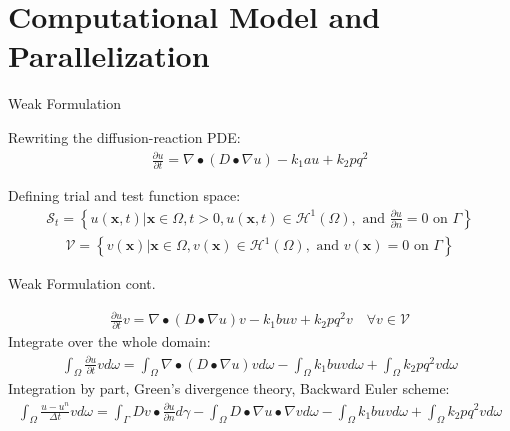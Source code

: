 \documentclass[11pt,t]{beamer}
\begin{document}
\section{Computational Model and Parallelization}

\begin{frame}[fragile]{Weak Formulation}

Rewriting the diffusion-reaction PDE:
\begin{gather*}
\frac{\partial u}{\partial t}=\nabla \bullet (D \bullet  \nabla u)-k_{1} a u+k_{2} p q^{2}
\end{gather*}

Defining trial and test function space:
\begin{gather*}
\mathcal{S}_{t}=\left\{u(\mathbf{x}, t) | \mathbf{x} \in \Omega, t>0, u(\mathbf{x}, t) \in \mathcal{H}^{1}(\Omega), \text { and } \frac{\partial u}{\partial n}=0 \text { on } \Gamma\right\}
\end{gather*}
\begin{gather*}
\mathcal{V}=\left\{v(\mathbf{x}) | \mathbf{x} \in {\Omega}, v(\mathbf{x}) \in \mathcal{H}^{1}(\Omega), \text { and } v(\mathbf{x})=0 \text { on } \Gamma\right\}
\end{gather*}


\end{frame}


\begin{frame}[fragile]{Weak Formulation cont.}

\begin{gather*}
\frac{\partial u}{\partial t} v=\nabla \bullet (D \bullet \nabla u) v-k_{1} b u v+k_{2} p q^{2} v \quad \forall v \in \mathcal{V}
\end{gather*}
Integrate over the whole domain:
\begin{gather*}
\int_{\Omega} \frac{\partial u}{\partial t} v d \omega=\int_{\Omega} \nabla \bullet (D \bullet \nabla u) v d \omega-\int_{\Omega} k_{1} b u v d \omega+\int_{\Omega} k_{2} p q^{2} v d \omega
\end{gather*}
Integration by part, Green's divergence theory, Backward Euler scheme:
\begin{gather*}
\int_{\Omega} \frac{u-u^{n}}{\Delta t} v d \omega=\int_{\Gamma} D v \bullet \frac{\partial u}{\partial n} d \gamma-\int_{\Omega} D \bullet \nabla u \bullet \nabla v d \omega-\int_{\Omega} k_{1} b u v d \omega+\int_{\Omega} k_{2} p q^{2} v d \omega
\end{gather*}

\end{frame}
\end{document}
